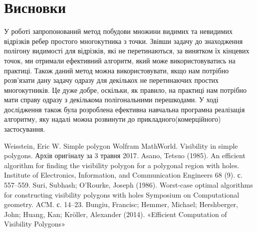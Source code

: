 \documentclass[a4paper, 12pt]{article}
\begin{document}
\section{Висновки}

У роботі запропонований метод побудови множини видимих та невидимих відрізків ребер простого многокутника з точки. Звівши задачу до знаходження полігону видимості для відрізків, які не перетинаються, за винятком їх кінцевих точок, ми отримали ефективний алгоритм, який може використовуватись на практиці. Також даний метод можна використовувати, якщо нам потрібно розв'язати дану задачу одразу для декількох не перетинаючих простих многокутників. Це дуже добре, оскільки, як правило, на практиці нам потрібно мати справу одразу з декількома полігональними перешкодами. У ході дослідження також була розроблена ефективна навчальна програмна реалізація алгоритму, яку надалі можна розвинути до прикладного(комерційного) застосування.

\begin{thebibliography}{3}
Weisstein, Eric W. Simple polygon Wolfram MathWorld.
Visibility in simple polygons. Архів оригіналу за 3 травня 2017.
Asano, Tetsuo (1985). An efficient algorithm for finding the visibility polygon for a polygonal region with holes. Institute of Electronics, Information, and Communication Engineers 68 (9). с. 557–559.
Suri, Subhash; O'Rourke, Joseph (1986). Worst-case optimal algorithms for constructing visibility polygons with holes Symposium on Computational geometry. ACM. с. 14–23.
Bungiu, Francisc; Hemmer, Michael; Hershberger, John; Huang, Kan; Kröller, Alexander (2014). «Efficient Computation of Visibility Polygons»
\end{thebibliography}
\end{document}
